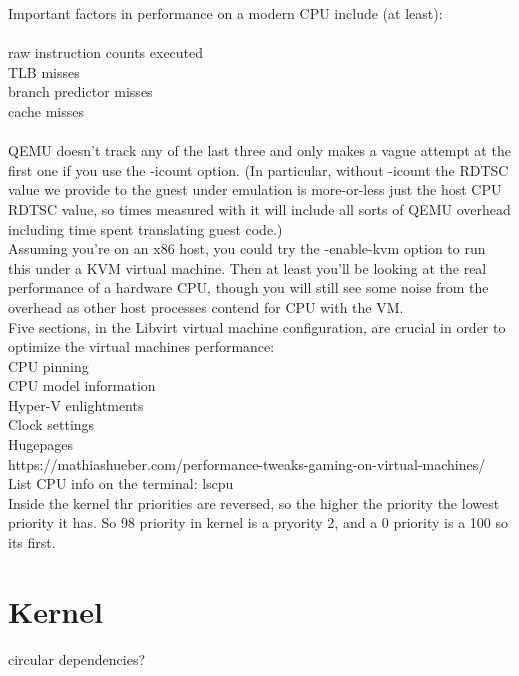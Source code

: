 \documentclass[11pt, a4paper, oneside]{article}
\theoremstyle{definition}
\begin{document}
Important factors in performance on a modern CPU include (at least):\\
\\
    raw instruction counts executed\\
    TLB misses\\
    branch predictor misses\\
    cache misses\\
\\
QEMU doesn't track any of the last three and only makes a vague attempt at the first one if you use the -icount option. (In particular, without -icount the RDTSC value we provide to the guest under emulation is more-or-less just the host CPU RDTSC value, so times measured with it will include all sorts of QEMU overhead including time spent translating guest code.)\\

Assuming you're on an x86 host, you could try the -enable-kvm option to run this under a KVM virtual machine. Then at least you'll be looking at the real performance of a hardware CPU, though you will still see some noise from the overhead as other host processes contend for CPU with the VM.\\

Five sections, in the Libvirt virtual machine configuration, are crucial in order to optimize the virtual machines performance:
\\
    CPU pinning\\
    CPU model information\\
    Hyper-V enlightments\\
    Clock settings\\
    Hugepages \\
https://mathiashueber.com/performance-tweaks-gaming-on-virtual-machines/
\\
List CPU info on the terminal: lscpu\\

Inside the kernel thr priorities are reversed, so the higher the priority the lowest priority it has. So 98 priority in kernel is a pryority 2, and a 0 priority is a 100 so its first.\\

\vfill
\pagebreak
\section{Kernel}
circular dependencies?\\
\end{document}
